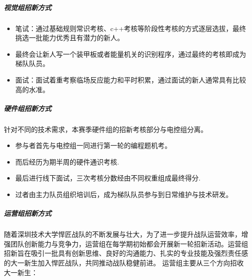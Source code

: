             \subparagraph{视觉组招新方式}


                \begin{itemize}
                    \item 笔试：通过基础规则常识考核、c++考核等阶段性考核的方式逐层选拔，最终挑选一批能力优秀且有潜力的新人。
                    \item 最终会让新人写一个装甲板或者能量机关的识别程序，通过最终的考核即成为梯队队员。
                    \item 面试：面试着重考察临场反应能力和平时积累，通过面试的新人通常具有比较高的水准。
                \end{itemize}

            \subparagraph{硬件组招新方式}

                针对不同的技术需求，本赛季硬件组的招新考核部分与电控组分离。


                \begin{itemize}
                    \item 参与者首先与电控组一同进行第一轮的编程题机考。
                    \item 而后经历为期半周的硬件通识考核.
                    \item 最后进行线下面试，三次考核分数经由不同权重组成最终得分.
                    \item 过者由主力队员组织培训后，成为梯队队员参与到日常维护与技术研发。
                \end{itemize}

            \subparagraph{运营组招新方式}

                随着深圳技术大学悍匠战队的不断发展与壮大，为了进一步提升战队运营效率，增强团队创新能力与竞争力，运营组在每学期初始都会开展新一轮招新活动。运营组招新旨在吸引一批具有创新思维、良好的沟通能力、扎实的专业技能及强烈责任感的大一新生加入悍匠战队，共同推动战队稳健前进。
                运营组主要从三个方向招收大一新生：


